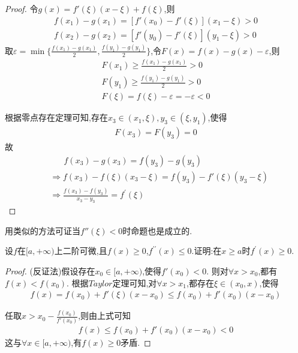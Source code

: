 \documentclass[lang=cn,newtx,10pt,scheme=chinese]{../Template/elegantbook}
\begin{document}
\begin{exercise}
\begin{proof}
    令$g(x)=f'(\xi)(x-\xi)+f(\xi)$,则
    \begin{gather}
        f(x_1)-g(x_1)=[f'(x_0)-f'(\xi)](x_1-\xi)>0
        \nonumber
        \\
        f(x_2)-g(x_2)=[f'(y_0)-f'(\xi)](y_1-\xi)>0
        \nonumber
    \end{gather}
    取$\varepsilon=\min\{\frac{f(x_1)-g(x_1)}{2},\frac{f(y_1)-g(y_1)}{2}\}$,令$F(x)=f(x)-g(x)-\varepsilon$,则
    \begin{gather}
    F(x_1)\geqslant \frac{f(x_1)-g(x_1)}{2}>0\nonumber
    \\
    F(y_1)\geqslant \frac{f(y_1)-g(y_1)}{2}>0
    \nonumber \\
    F(\xi)=f(\xi)-\varepsilon=-\varepsilon<0
        \nonumber
    \end{gather}

    根据零点存在定理可知,存在$x_3\in(x_1,\xi),y_3\in(\xi,y_1)$,使得
    \begin{gather}
    F(x_3)=F(y_3)=0
        \nonumber
    \end{gather}
    故
    \begin{equation}
        \begin{split}
        &\,\,\,\,\,\,\,\,\,\,f(x_3)-g(x_3)=f(y_3)-g(y_3)
        \nonumber
        \\
        &\Rightarrow f(x_3)-f(\xi)(x_3-\xi)=f(y_3)-f'(\xi)(y_3-\xi)
        \nonumber
        \\
        &\Rightarrow \frac{f(x_3)-f(y_3)}{x_3 - y_3}=f^{\prime}(\xi)
        \nonumber
    \end{split}
    \end{equation}
    \end{proof}
    \begin{remark}
        用类似的方法可证当$f''(\xi)<0$时命题也是成立的.
    \end{remark}
\end{exercise}

\begin{exercise}
设\(f\)在\([a,+\infty)\)上二阶可微,且\(f(x)\geq0\),\(f^{\prime\prime}(x)\leq0\).证明:在\(x\geq a\)时\(f^{\prime}(x)\geq0\).    
    \begin{proof}
        (反证法)假设存在$x_0\in[a,+\infty)$,使得$f'(x_0)<0$.
        则对$\forall x>x_0$,都有$f(x)<f(x_0)$.
        根据$Taylor$定理可知,对$\forall x>x_1$,都存在$\xi\in(x_0,x)$,使得
        \begin{gather}
            f(x)=f(x_0)+f'(\xi)(x-x_0)\leqslant f(x_0)+f'(x_0)(x-x_0)
            \nonumber
        \end{gather}
        
        任取$x>x_0-\frac{f(x_0)}{f'(x_0)}$,则由上式可知
        \begin{gather}
            f(x)\leqslant f(x_0)+f'(x_0)(x-x_0)<0
            \nonumber
        \end{gather}
        这与$\forall x\in[a,+\infty)$,有$f(x)\ge 0$矛盾.
    \end{proof}
\end{exercise}
\end{document}
